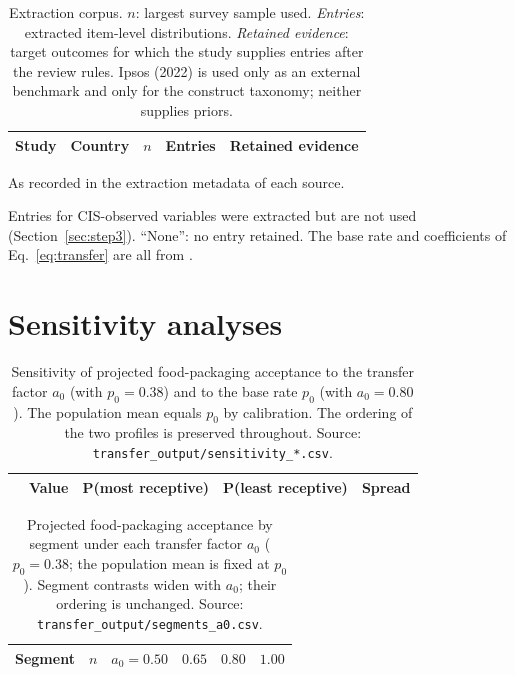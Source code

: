 \begin{table}[htbp]
\centering
\caption{Extraction corpus. $n$: largest survey sample used.
\emph{Entries}: extracted item-level distributions. \emph{Retained evidence}:
target outcomes for which the study supplies entries after the review rules.
Ipsos (2022) is used only as an external benchmark
and \citet{polyportis2022} only for the construct taxonomy; neither supplies
priors.}
\label{tab:studies}
\small
\begin{threeparttable}
\begin{tabular}{p{3.9cm}p{2.1cm}rrp{5.6cm}}
\toprule
\textbf{Study} & \textbf{Country}\tnote{a} & $n$ & \textbf{Entries} &
  \textbf{Retained evidence}\tnote{b} \\
\midrule
\bottomrule
\end{tabular}
\begin{tablenotes}\small
\item[a] As recorded in the extraction metadata of each source.
\item[b] Entries for CIS-observed variables were extracted but are not used
  (Section~\ref{sec:step3}). ``None'': no entry retained. The base rate and
  coefficients of Eq.~\eqref{eq:transfer} are all from \citet{ruokamo2022}.
\end{tablenotes}
\end{threeparttable}
\end{table}

\section{Sensitivity analyses}
\label{app:sensitivity}

\begin{table}[htbp]
\centering
\caption{Sensitivity of projected food-packaging acceptance to the transfer
factor $a_0$ (with $p_0 = 0.38$) and to the base rate $p_0$ (with
$a_0 = 0.80$). The population mean equals $p_0$ by calibration. The ordering of
the two profiles is preserved throughout. Source:
\texttt{transfer\_output/sensitivity\_*.csv}.}
\label{tab:a0_sensitivity}
\small
\begin{tabular}{lcccc}
\toprule
 & \textbf{Value} & P(most receptive) & P(least receptive) & \textbf{Spread} \\
\midrule
\midrule
\bottomrule
\end{tabular}
\end{table}


\begin{table}[htbp]
\centering
\caption{Projected food-packaging acceptance by segment under each transfer
factor $a_0$ ($p_0 = 0.38$; the population mean is fixed at $p_0$). Segment
contrasts widen with $a_0$; their ordering is unchanged. Source:
\texttt{transfer\_output/segments\_a0.csv}.}
\label{tab:seg_a0}
\small
\begin{tabular}{lrcccc}
\toprule
\textbf{Segment} & $n$ & $a_0 = 0.50$ & $0.65$ & $0.80$ & $1.00$ \\
\midrule
\bottomrule
\end{tabular}
\end{table}


